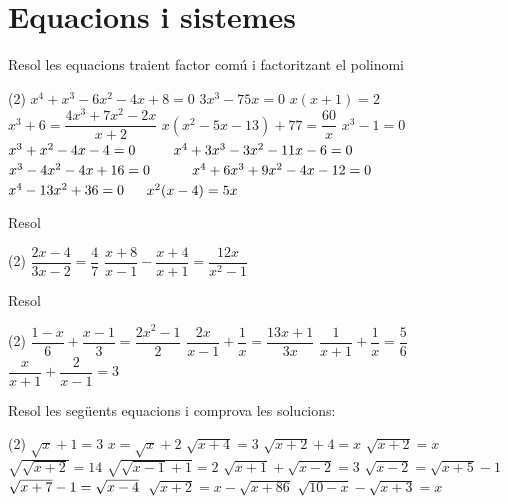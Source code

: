 \documentclass[11pt, a4paper, pdf]{article}
\let\frac\dfrac
\begin{document}
\section{Equacions i sistemes }
 \begin{mylist}
 
 
 \item Resol les equacions traient factor com\'{u} i factoritzant el polinomi 
 \begin{tasks}(2)
 	\task  $x^{4} +x^{3} -6x^{2} -4x+8=0$ 
 	\task  $3x^{3} -75x=0$
 	\task  $x(x+1)=2$   
 	\task $x^{3} +6=\frac{4x^{3} +7x^{2} -2x}{x+2} $
 	\task  $x(x^{2} -5x-13)+77=\frac{60}{x} $ 
 	\task  $x^{3} -1=0$
 	\task  $x^{3} +x^{2} -4x-4=0{\rm \; \; \; \; \; \; \; \; }$ 
 	\task  $x^{4} +3x^{3} -3x^{2} -11x-6=0{\rm \; \; \; \; \; \; \; \; \; }$
 	\task  $x^{3} -4x^{2} -4x+16=0{\rm \; \; \; \; \; \; \; \; \; }$ 
 	\task  $x^{4} +6x^{3} +9x^{2} -4x-12=0{\rm \; \; \; \; \; \; \; \; \; \; }$
 	\task  $x^{4} -13x^{2} +36=0{\rm \; \; \; \; }$  
 	\task $x^{2} (x-4)=5x{\rm \; \; \; \; \; }$
 \end{tasks}
 


 \item Resol
 \begin{tasks}(2)
 	\task $\dfrac{2x-4}{3x-2} =\dfrac{4}{7} $   \task $\dfrac{x+8}{x-1} -\dfrac{x+4}{x+1} =\dfrac{12x}{x^{2} -1} $ 
 \end{tasks}
 
 \item   Resol  
 \begin{tasks}(2)
 	\task $\dfrac{1-x}{6} +\dfrac{x-1}{3} =\dfrac{2x^{2} -1}{2} $  
 	\task  $\dfrac{2x}{x-1} +\dfrac{1}{x} =\dfrac{13x+1}{3x} $
 	\task $\dfrac{1}{x+1} +\dfrac{1}{x} =\dfrac{5}{6} $   
 	\task  $\dfrac{x}{x+1} +\dfrac{2}{x-1} =3$
 \end{tasks}
 
 
 
 \item   Resol les seg\"{u}ents equacions i comprova les solucions:
 \begin{tasks}(2)
 	\task $\sqrt{x} +1=3$  
 	\task $x=\sqrt{x}+2 $   
 	\task $\sqrt{x+4} =3$
 	\task $\sqrt{x+2} +4 =x$  
 	\task $\sqrt{x+2} =x$   
 	\task $\sqrt{\sqrt{x+2} } =14$
 	\task $\sqrt{\sqrt{x-1} +1} =2$  
 	\task $\sqrt{x+1} +\sqrt{x-2} =3$  
 	\task $\sqrt{x-2} =\sqrt{x+5} -1$
 	\task $\sqrt{x+7} -1=\sqrt{x-4} {\rm \; }$ 
 	\task $\sqrt{x+2} =x-\sqrt{x+86}$ 
 	\task $\sqrt{10-x} -\sqrt{x+3} =x$
 \end{tasks}
 

\end{mylist}
\end{document}

